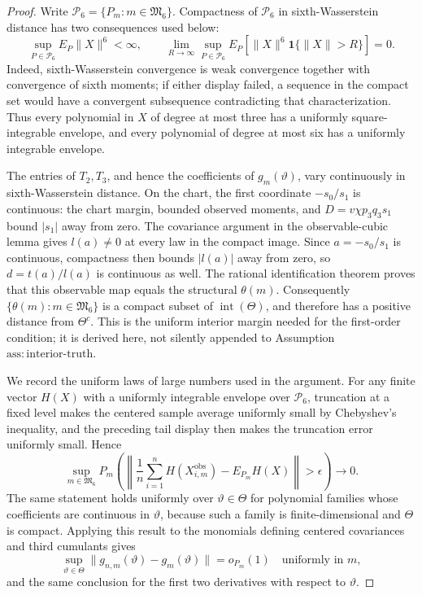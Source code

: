 \documentclass{article}
\begin{document}
\begin{proof}
Write \(\mathcal P_6=\{P_m:m\in\mathfrak M_6\}\). Compactness of \(\mathcal P_6\) in sixth-Wasserstein distance has two consequences used below:
\[
\sup_{P\in\mathcal P_6}E_P\|X\|^6<\infty,
\qquad
\lim_{R\to\infty}\sup_{P\in\mathcal P_6}
E_P[\|X\|^6\mathbf 1\{\|X\|>R\}]=0.
\]
Indeed, sixth-Wasserstein convergence is weak convergence together with convergence of sixth moments; if either display failed, a sequence in the compact set would have a convergent subsequence contradicting that characterization. Thus every polynomial in \(X\) of degree at most three has a uniformly square-integrable envelope, and every polynomial of degree at most six has a uniformly integrable envelope.

The entries of \(T_2,T_3\), and hence the coefficients of \(g_m(\vartheta)\), vary continuously in sixth-Wasserstein distance. On the chart, the first coordinate \(-s_0/s_1\) is continuous: the chart margin, bounded observed moments, and \(D=v\chi p_3q_3s_1\) bound \(|s_1|\) away from zero. The covariance argument in the observable-cubic lemma gives \(l(a)\neq0\) at every law in the compact image. Since \(a=-s_0/s_1\) is continuous, compactness then bounds \(|l(a)|\) away from zero, so \(d=t(a)/l(a)\) is continuous as well. The rational identification theorem proves that this observable map equals the structural \(\theta(m)\). Consequently \(\{\theta(m):m\in\mathfrak M_6\}\) is a compact subset of \(\operatorname{int}(\Theta)\), and therefore has a positive distance from \(\Theta^c\). This is the uniform interior margin needed for the first-order condition; it is derived here, not silently appended to Assumption \(\mathrm{ass:interior\mbox{-}truth}\).

We record the uniform laws of large numbers used in the argument. For any finite vector \(H(X)\) with a uniformly integrable envelope over \(\mathcal P_6\), truncation at a fixed level makes the centered sample average uniformly small by Chebyshev's inequality, and the preceding tail display then makes the truncation error uniformly small. Hence
\[
\sup_{m\in\mathfrak M_6}
P_m\!\left(\left\|\frac1n\sum_{i=1}^nH(X_{i,m}^{\mathrm{obs}})-E_{P_m}H(X)\right\|>\epsilon\right)\to0.
\]
The same statement holds uniformly over \(\vartheta\in\Theta\) for polynomial families whose coefficients are continuous in \(\vartheta\), because such a family is finite-dimensional and \(\Theta\) is compact. Applying this result to the monomials defining centered covariances and third cumulants gives
\[
\sup_{\vartheta\in\Theta}\|g_{n,m}(\vartheta)-g_m(\vartheta)\|=o_{P_m}(1)
\quad\text{uniformly in }m,
\]
and the same conclusion for the first two derivatives with respect to \(\vartheta\).


\end{proof}
\end{document}
